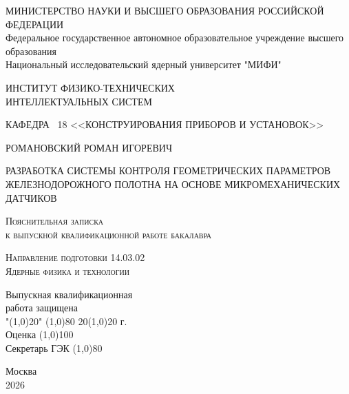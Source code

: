 
\begin{center}
	МИНИСТЕРСТВО НАУКИ И ВЫСШЕГО ОБРАЗОВАНИЯ РОССИЙСКОЙ ФЕДЕРАЦИИ\\
	\vspace{0.1em}
	Федеральное государственное автономное образовательное учреждение высшего образования\\
	\vspace{0.1em}
	Национальный исследовательский ядерный университет "МИФИ" 
	
	\hrulefill
\end{center}

\begin{center}
	ИНСТИТУТ ФИЗИКО-ТЕХНИЧЕСКИХ \\ ИНТЕЛЛЕКТУАЛЬНЫХ СИСТЕМ
	
	КАФЕДРА  \No~18 <<КОНСТРУИРОВАНИЯ ПРИБОРОВ И УСТАНОВОК>>
\end{center}

\vspace{1em}
%

\begin{center}
	РОМАНОВСКИЙ РОМАН ИГОРЕВИЧ
\end{center}

\vspace{2em}

\begin{center}
	
	РАЗРАБОТКА СИСТЕМЫ КОНТРОЛЯ ГЕОМЕТРИЧЕСКИХ ПАРАМЕТРОВ ЖЕЛЕЗНОДОРОЖНОГО ПОЛОТНА НА ОСНОВЕ МИКРОМЕХАНИЧЕСКИХ ДАТЧИКОВ
	
\end{center}

\vspace{3em}

\begin{center}
	\textsc{Пояснительная записка \\ к выпускной квалификационной работе бакалавра}
\end{center}

\begin{center}
	\textsc{Направление подготовки 14.03.02\\Ядерные физика и технологии}
\end{center}

\vspace{1em}

\begin{flushright}

Выпускная квалификационная \\
работа защищена \\
"\line(1,0){20}" \line(1,0){80} 20\line(1,0){20} г. \\
Оценка \line(1,0){100} \\
Секретарь ГЭК \line(1,0){80} \\

\end{flushright}

\vspace{3em}

\begin{center}
	Москва \\ 2026
\end{center}

\newpage
